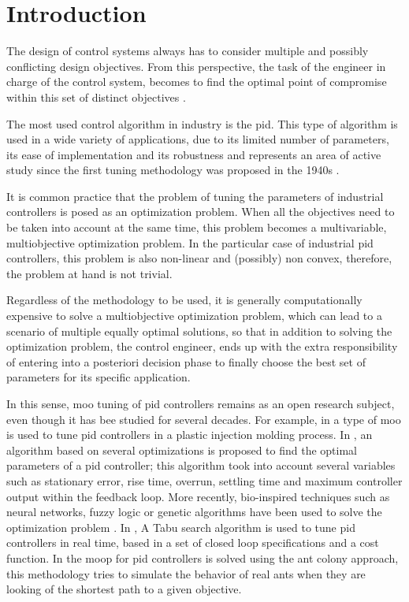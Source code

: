\chapter{Introduction}
\label{sec:Antecedentes}
The design of control systems always has to consider multiple and possibly conflicting design objectives. From this perspective, the task of the engineer in charge of the control system, becomes to find the optimal point of compromise within this set of distinct objectives \citep{Garpinger2012}.

The most used control algorithm in industry is the \gls{pid}. This type of algorithm is used in a wide variety of applications, due to its limited number of parameters, its ease of implementation and its robustness \citep{astromhagglund2006} and represents an area of active study since the first tuning methodology was proposed in the 1940s \citep{Ziegler1942}.

It is common practice that the problem of tuning the parameters of industrial controllers is posed as an optimization problem. When all the objectives need to be taken into account at the same time, this problem becomes a multivariable, multiobjective optimization problem. In the particular case of industrial \gls{pid} controllers, this problem is also non-linear and (possibly) non convex, therefore, the problem at hand is not trivial.

Regardless of the methodology to be used, it is generally computationally expensive to solve a multiobjective optimization problem, which can lead to a scenario of multiple equally optimal solutions, so that in addition to solving the optimization problem, the control engineer, ends up with the extra responsibility of entering into a posteriori decision phase  to finally choose the best set of parameters for its specific application.

In this sense, \gls{moo} tuning of \gls{pid} controllers remains as an open research subject, even though it has bee studied for several decades. For example, in \citet{Seaman1994} a type of \gls{moo} is used to tune \gls{pid} controllers in a plastic injection molding process. In \citet{Abbas1995}, an algorithm based on several optimizations is proposed to find the optimal parameters of a \gls{pid} controller; this algorithm took into account several variables such as stationary error, rise time, overrun, settling time and maximum controller output within the feedback loop. More recently, bio-inspired techniques such as neural networks, fuzzy logic or genetic algorithms have been used to solve the optimization problem \citet{Reynoso-Meza2012b}. In \citet{Bagis2011}, A Tabu search algorithm is used to tune \gls{pid} controllers in real time, based in a set of closed loop specifications and a cost function. In \citet{Chiha2012} the \gls{moop} for \gls{pid} controllers is solved using the ant colony approach, this methodology tries to simulate the behavior of real ants when they are looking of the shortest path to a given objective.

